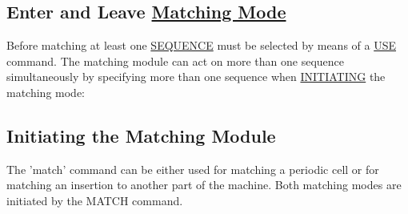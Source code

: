 







\subsection{
 Enter and Leave \href{match.html}{Matching
 Mode}}
 Before matching at least one \href{../Introduction/sequence.html}{SEQUENCE}
 must be selected by means of a \href{../control/general.html#use}{USE}
 command. The matching module can act on more than one sequence simultaneously
 by specifying more than one sequence when \href{../match/match_main.html#match}{INITIATING}
 the matching mode:
 

\subsection{\href{match}{}Initiating the Matching Module}
 The 'match' command can be either used for matching a periodic cell or
 for matching an insertion to another part of the machine. Both matching
 modes are initiated by the MATCH command.
 
